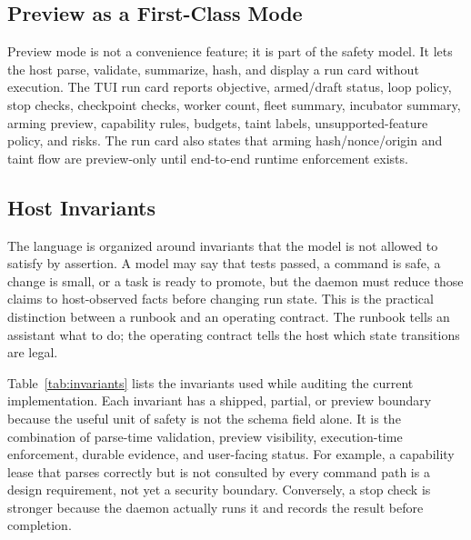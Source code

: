\documentclass[conference]{IEEEtran}
\begin{document}
\subsection{Preview as a First-Class Mode}

Preview mode is not a convenience feature; it is part of the safety model. It lets the host parse, validate, summarize, hash, and display a run card without execution. The TUI run card reports objective, armed/draft status, loop policy, stop checks, checkpoint checks, worker count, fleet summary, incubator summary, arming preview, capability rules, budgets, taint labels, unsupported-feature policy, and risks. The run card also states that arming hash/nonce/origin and taint flow are preview-only until end-to-end runtime enforcement exists.

\subsection{Host Invariants}

The language is organized around invariants that the model is not allowed to satisfy by assertion. A model may say that tests passed, a command is safe, a change is small, or a task is ready to promote, but the daemon must reduce those claims to host-observed facts before changing run state. This is the practical distinction between a runbook and an operating contract. The runbook tells an assistant what to do; the operating contract tells the host which state transitions are legal.

Table~\ref{tab:invariants} lists the invariants used while auditing the current implementation. Each invariant has a shipped, partial, or preview boundary because the useful unit of safety is not the schema field alone. It is the combination of parse-time validation, preview visibility, execution-time enforcement, durable evidence, and user-facing status. For example, a capability lease that parses correctly but is not consulted by every command path is a design requirement, not yet a security boundary. Conversely, a stop check is stronger because the daemon actually runs it and records the result before completion.
\end{document}
